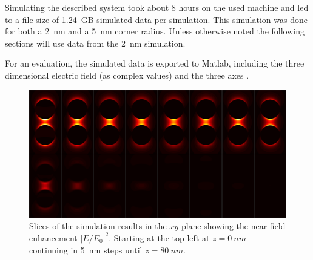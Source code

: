 Simulating the described system took about 8 hours on the used machine and led to a file size of \SI{1.24}{GB} simulated data per simulation. This simulation was done for both a \SI{2}{nm} and a \SI{5}{nm} corner radius. Unless otherwise noted the following sections will use data from the \SI{2}{nm} simulation.

For an evaluation, the simulated data is exported to Matlab, including the three dimensional electric field (as complex values) and the three axes .

\begin{figure}[!h]
  \includegraphics[width=\textwidth]{./images/simulation-slices.png}
  \caption{Slices of the simulation results in the $x y$-plane showing the near field enhancement $|E/E_0|^2$. Starting at the top left at $z=\SI{0}{nm}$ continuing in \SI{5}{nm} steps until $z=\SI{80}{nm}$. }
  \label{fig:slices}
\end{figure}
